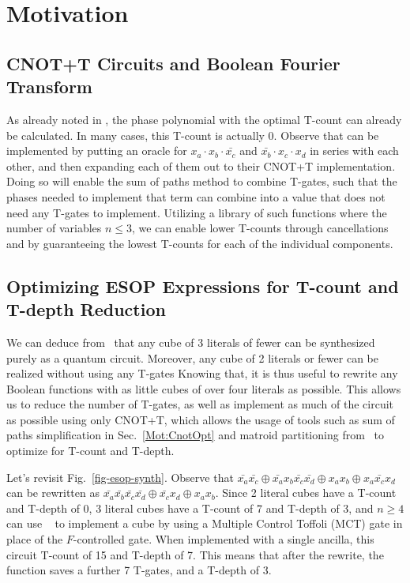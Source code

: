 \section{Motivation}
\label{Mot}

\subsection{CNOT+T Circuits and Boolean Fourier Transform}
\label{Mot:CNOTBool}

As already noted in , the phase polynomial with the optimal T-count can already
be calculated. In many cases, this T-count is actually 0. Observe that  can
be implemented by putting an oracle for $x_a \cdot x_b \cdot \bar{x_c}$ and $\bar{x_b} \cdot x_c \cdot x_d$
in series with each other, and then expanding each of them out to their CNOT+T implementation.
Doing so will enable the sum of paths method to combine T-gates, such that the phases needed to implement
that term can combine into a value that does not need any T-gates to implement. Utilizing a library of
such functions where the number of variables $n \leq 3$, we can enable lower T-counts through cancellations
and by guaranteeing the lowest T-counts for each of the individual components.

\subsection{Optimizing ESOP Expressions for T-count and T-depth Reduction}
\label{Mot:Lib}

We can deduce from~ that any cube of 3 literals of fewer can be synthesized purely as
a quantum circuit. Moreover, any cube of 2 literals or fewer can be realized without using any T-gates
Knowing that, it is thus useful to rewrite any Boolean functions with as little cubes of over four literals
as possible. This allows us to reduce the number of T-gates, as well as implement as much of
the circuit as possible using only CNOT+T, which allows the usage of tools such as
sum of paths simplification in Sec.~\ref{Mot:CnotOpt} and matroid partitioning
from~\cite{bib-amy-matroid} to optimize for T-count and T-depth.

\begin{example}
  \label{ex-esop-synth2}
  Let's revisit Fig.~\ref{fig-esop-synth}. Observe that
  $\bar{x_a}\bar{x_c} \oplus \bar{x_a} x_b \bar{x_c}\bar{x_d} \oplus x_a x_b \oplus x_a \bar{x_c} x_d$
  can be rewritten as
  $\bar{x_a} \bar{x_b} \bar{x_c} \bar{x_d} \oplus \bar{x_c} x_d \oplus x_a x_b$. Since 2 literal cubes have
  a T-count and T-depth of 0, 3 literal cubes have a T-count of 7 and T-depth of 3, and $n \geq 4$ can use
  ~ to implement a cube by using a Multiple Control Toffoli (MCT) gate in place of the
  $F$-controlled gate. When implemented with a single ancilla, this circuit T-count of 15 and T-depth of 7.
  This means that after the rewrite, the function saves a further 7 T-gates, and a T-depth of 3.
\end{example}

